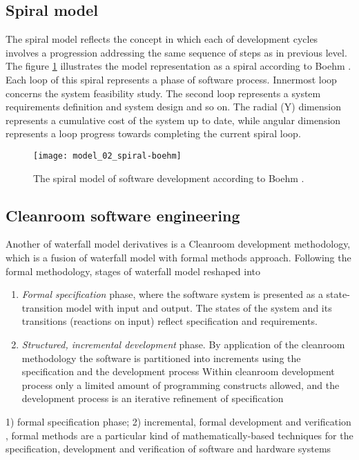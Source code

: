 \subsection{Spiral model}
The spiral model reflects the concept in which each of development cycles involves a 
progression addressing the same sequence of steps as in previous level. The figure 
\ref{fig:model_spiral} illustrates the model representation as a spiral according 
to Boehm \cite{citeulike:10002126}. Each loop of this spiral represents a phase of 
software process. Innermost loop concerns the system feasibility study. The second 
loop represents a system requirements definition and system design and so on. 
The radial (Y) dimension represents a cumulative cost of the system up to date, 
while angular dimension represents a loop progress towards completing the current 
spiral loop.

\begin{figure}[tbp]
   \centering
   \texttt{[image: model\_02\_spiral-boehm]}
   \caption{The spiral model of software development according to Boehm \cite{citeulike:10002126}. }
   \label{fig:model_spiral}
\end{figure}



\subsection{Cleanroom software engineering}
Another of waterfall model derivatives is a Cleanroom development methodology, which is
a fusion of waterfall model with formal methods approach. 
Following the formal methodology, stages of waterfall model reshaped into 
\begin{enumerate}
 \item \textit{Formal specification} phase, where the software system is presented as 
a state-transition model with input and output. The states of the system and
its transitions (reactions on input) reflect specification and requirements.
 \item \textit{Structured, incremental development} phase. By application of the 
cleanroom methodology the software is partitioned into increments using the 
specification and the development process Within cleanroom
development process only a limited amount of programming constructs allowed,
and the development process is an iterative refinement of specification
\end{enumerate}

1) formal specification phase; 2) incremental, formal development and verification 
, formal methods are a particular kind of mathematically-based techniques for
the specification, development and verification of software and hardware systems

